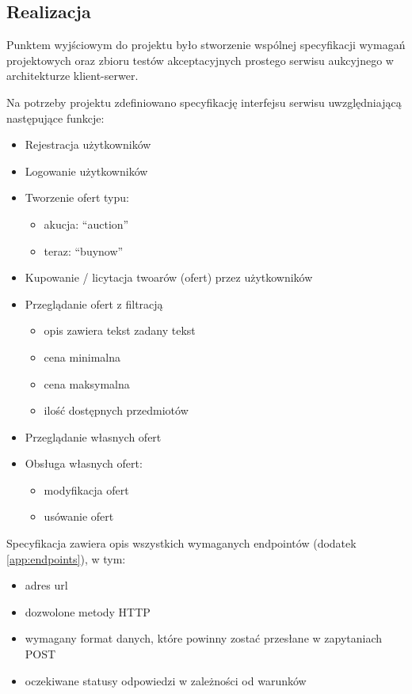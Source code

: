 \documentclass[12pt, notitlepage]{article}
\begin{document}
\subsection{Realizacja}

Punktem wyjściowym do projektu było stworzenie wspólnej specyfikacji wymagań projektowych oraz zbioru testów akceptacyjnych \cite{tests} prostego serwisu aukcyjnego w architekturze klient-serwer.

Na potrzeby projektu zdefiniowano specyfikację interfejsu serwisu uwzględniającą następujące funkcje:
\begin{itemize}
    \item Rejestracja użytkowników
	\item Logowanie użytkowników
	\item Tworzenie ofert typu:
    \begin{itemize}
		\item akucja: ``auction''
		\item teraz: ``buynow''
    \end{itemize}
	\item Kupowanie / licytacja twoarów (ofert) przez użytkowników
    \item Przeglądanie ofert z filtracją
    \begin{itemize}
        \item opis zawiera tekst zadany tekst
        \item cena minimalna
        \item cena maksymalna
        \item ilość dostępnych przedmiotów
    \end{itemize}
	\item Przeglądanie własnych ofert
    \item Obsługa własnych ofert:
    \begin{itemize}
		\item modyfikacja ofert
        \item usówanie ofert
    \end{itemize}
\end{itemize}

Specyfikacja zawiera opis wszystkich wymaganych endpointów (dodatek \ref{app:endpoints}), w tym:
\begin{itemize}
    \item adres url
    \item dozwolone metody HTTP
    \item wymagany format danych, które powinny zostać przesłane w zapytaniach POST
    \item oczekiwane statusy odpowiedzi w zależności od warunków
\end{itemize}
\end{document}
